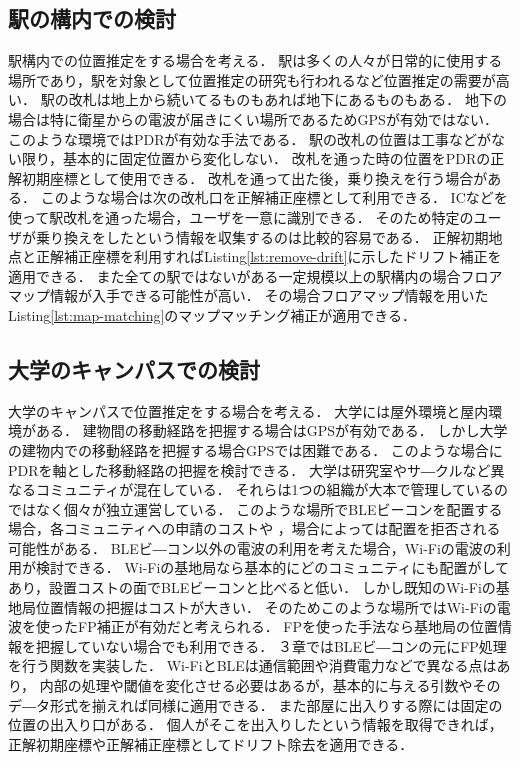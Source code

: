 \subsection{駅の構内での検討}
駅構内での位置推定をする場合を考える．
駅は多くの人々が日常的に使用する場所であり，駅を対象として位置推定の研究も行われるなど位置推定の需要が高い．
駅の改札は地上から続いてるものもあれば地下にあるものもある．
地下の場合は特に衛星からの電波が届きにくい場所であるためGPSが有効ではない．
このような環境ではPDRが有効な手法である．
駅の改札の位置は工事などがない限り，基本的に固定位置から変化しない．
改札を通った時の位置をPDRの正解初期座標として使用できる．
改札を通って出た後，乗り換えを行う場合がある．
このような場合は次の改札口を正解補正座標として利用できる．
ICなどを使って駅改札を通った場合，ユーザを一意に識別できる．
そのため特定のユーザが乗り換えをしたという情報を収集するのは比較的容易である．
正解初期地点と正解補正座標を利用すればListing\ref{lst:remove-drift}に示したドリフト補正を適用できる．
また全ての駅ではないがある一定規模以上の駅構内の場合フロアマップ情報が入手できる可能性が高い．
その場合フロアマップ情報を用いたListing\ref{lst:map-matching}のマップマッチング補正が適用できる．

\subsection{大学のキャンパスでの検討}
大学のキャンパスで位置推定をする場合を考える．
大学には屋外環境と屋内環境がある．
建物間の移動経路を把握する場合はGPSが有効である．
しかし大学の建物内での移動経路を把握する場合GPSでは困難である．
このような場合にPDRを軸とした移動経路の把握を検討できる．
大学は研究室やサ―クルなど異なるコミュニティが混在している．
それらは1つの組織が大本で管理しているのではなく個々が独立運営している．
このような場所でBLEビーコンを配置する場合，各コミュニティへの申請のコストや
，場合によっては配置を拒否される可能性がある．
BLEビ―コン以外の電波の利用を考えた場合，Wi-Fiの電波の利用が検討できる．
Wi-Fiの基地局なら基本的にどのコミュニティにも配置がしてあり，設置コストの面でBLEビーコンと比べると低い．
しかし既知のWi-Fiの基地局位置情報の把握はコストが大きい．
そのためこのような場所ではWi-Fiの電波を使ったFP補正が有効だと考えられる．
FPを使った手法なら基地局の位置情報を把握していない場合でも利用できる．
３章ではBLEビ―コンの元にFP処理を行う関数を実装した．
Wi-FiとBLEは通信範囲や消費電力などで異なる点はあり，
内部の処理や閾値を変化させる必要はあるが，基本的に与える引数やそのデ―タ形式を揃えれば同様に適用できる．
また部屋に出入りする際には固定の位置の出入り口がある．
個人がそこを出入りしたという情報を取得できれば，
正解初期座標や正解補正座標としてドリフト除去を適用できる．


